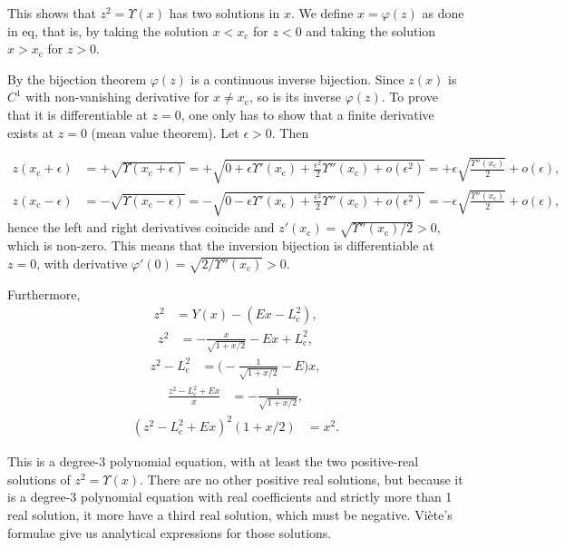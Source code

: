\documentclass[11pt]{article}
\newcommand{\rc}{\mathrm{c}}
\newcommand{\Lc}{L_{{\mathrm{c}}}}
\newcommand{\xc}{x_{\rc}}
\begin{document}
\begin{appendices}
This shows that $z^{2}=\Upsilon(x)$ has two solutions in $x$. We define $x=\varphi(z)$ as done in eq, that is, by taking the solution $x<\xc$ for $z<0$ and taking the solution $x>\xc$ for $z>0$.

By the bijection theorem $\varphi(z)$ is a continuous inverse bijection. Since $z(x)$ is $C^{1}$ with non-vanishing derivative for $x\neq\xc$, so is its inverse $\varphi(z)$. To prove that it is differentiable at $z=0$, one only has to show that a finite derivative exists at $z=0$ (mean value theorem). Let $\epsilon>0$. Then

\begin{align*}
  z(\xc+\epsilon) &= +\sqrt{\Upsilon(\xc+\epsilon)} = +\sqrt{0+\epsilon \Upsilon'(\xc)+\frac{\epsilon^{2}}{2} \Upsilon''(\xc)+o(\epsilon^{2})} =+ \epsilon\sqrt{\frac{\Upsilon''(\xc)}{2}} + o(\epsilon) ,\\
  z(\xc-\epsilon) &= -\sqrt{\Upsilon(\xc-\epsilon)} = -\sqrt{0-\epsilon \Upsilon'(\xc)+\frac{\epsilon^{2}}{2} \Upsilon''(\xc)+o(\epsilon^{2})} = -\epsilon\sqrt{\frac{\Upsilon''(\xc)}{2}} + o(\epsilon) ,
  \end{align*}
hence the left and right derivatives coincide and $z'(\xc)=\sqrt{\Upsilon''(\xc)/2}>0$, which is non-zero. This means that the inversion bijection is differentiable at $z=0$, with derivative $\varphi'(0)=\sqrt{2/\Upsilon''(\xc)}>0$.

Furthermore,
\begin{align*}
  z^{2} &= Y(x) - (E x-\Lc^{2})  ,
\end{align*}
\begin{align*}
  z^{2} &= -\frac{x}{\sqrt{1+x/2}}-E x + \Lc^{2} ,
\end{align*}
\begin{align*}
 z^{2}-\Lc^{2} &= \bigg(-\frac{1}{\sqrt{1+x/2}}-E\bigg)x ,
  \end{align*}
\begin{align*}
\frac{z^{2}-\Lc^{2}+E x}{x} &= -\frac{1}{\sqrt{1+x/2}} ,
  \end{align*}
\begin{align*}
(z^{2}-\Lc^{2}+E x)^{2}(1+x/2) &=x^{2} .
  \end{align*}

This is a degree-3 polynomial equation, with at least the two positive-real solutions of $z^{2}=\Upsilon(x)$. There are no other positive real solutions, but because it is a degree-3 polynomial equation with real coefficients and strictly more than 1 real solution, it more have a third real solution, which must be negative. Viète's formulae give us analytical expressions for those solutions.


\end{appendices}
\end{document}
